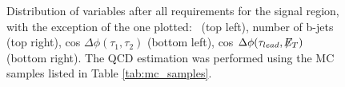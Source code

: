 \begin{figure}[H]
\begin{center}
 \captionsetup[subfloat]{farskip=0pt,captionskip=0.0cm,labelformat=empty}
 \end{center}
 \caption{Distribution of variables after all requirements for the signal region, with the exception of the
one plotted: \MET~(top left), number of b-jets (top right), cos $\Delta \phi (\tau_{1},\tau_{2})$ (bottom left), 
cos $\Delta \phi (\tau_{lead}, \not\!\!E_T)$ (bottom right). The QCD estimation was performed using the MC samples listed in Table \ref{tab:mc_samples}.}
\label{nminusone_MC} 
 \end{figure}
 
